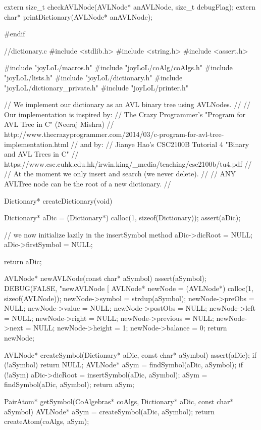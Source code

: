 extern size_t checkAVLNode(AVLNode* anAVLNode, size_t debugFlag);
extern char* printDictionary(AVLNode* anAVLNode);

#endif
\stoptyping

\starttyping
//dictionary.c
#include <stdlib.h>
#include <string.h>
#include <assert.h>

#include "joyLoL/macros.h"
#include "joyLoL/coAlg/coAlgs.h"
#include "joyLoL/lists.h"
#include "joyLoL/dictionary.h"
#include "joyLoL/dictionary_private.h"
#include "joyLoL/printer.h"

// We implement our dictionary as an AVL binary tree using AVLNodes.
//
// Our implementation is inspired by:
// The Crazy Programmer's "Program for AVL Tree in C" (Neeraj Mishra)
// http://www.thecrazyprogrammer.com/2014/03/c-program-for-avl-tree-implementation.html
// and by:
// Jianye Hao's CSC2100B Tutorial 4 "Binary and AVL Trees in C"
// https://www.cse.cuhk.edu.hk/irwin.king/_media/teaching/csc2100b/tu4.pdf
//
// At the moment we only insert and search (we never delete).
//
// ANY AVLTree node can be the root of a new dictionary.
//

Dictionary* createDictionary(void) {
  Dictionary* aDic = (Dictionary*) calloc(1, sizeof(Dictionary));
  assert(aDic);

  // we now initialize lazily in the insertSymbol method
  aDic->dicRoot     = NULL;
  aDic->firstSymbol = NULL;

  return aDic;
}

AVLNode* newAVLNode(const char* aSymbol) {
  assert(aSymbol);
  DEBUG(FALSE, "newAVLNode [%
  AVLNode* newNode  = (AVLNode*) calloc(1, sizeof(AVLNode));
  newNode->symbol   = strdup(aSymbol);
  newNode->preObs   = NULL;
  newNode->value    = NULL;
  newNode->postObs  = NULL;
  newNode->left     = NULL;
  newNode->right    = NULL;
  newNode->previous = NULL;
  newNode->next     = NULL;
  newNode->height   = 1;
  newNode->balance  = 0;
  return newNode;
}

AVLNode* createSymbol(Dictionary* aDic, const char* aSymbol) {
  assert(aDic);
  if (!aSymbol) return NULL;
  AVLNode* aSym = findSymbol(aDic, aSymbol);
  if (!aSym) {
    aDic->dicRoot = insertSymbol(aDic, aSymbol);
    aSym = findSymbol(aDic, aSymbol);
  }
  return aSym;
}

PairAtom* getSymbol(CoAlgebras* coAlgs,
                    Dictionary* aDic,
                    const char* aSymbol) {
  AVLNode* aSym = createSymbol(aDic, aSymbol);
  return createAtom(coAlgs, aSym);
}

